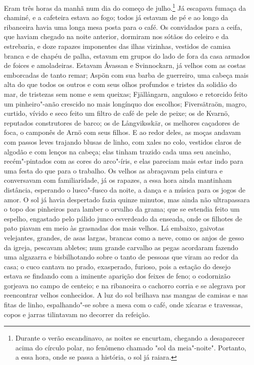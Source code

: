Eram três horas da manhã num dia do começo de julho.\footnote{ Durante o 
verão escandinavo, as noites se encurtam, chegando a desaparecer 
acima do círculo polar, no fenômeno chamado "sol da meia"-noite". Portanto, 
a essa hora, onde se passa a história, o sol já raiara.} Já escapava fumaça da
chaminé, e a cafeteira estava ao fogo; todos já estavam de pé e ao longo da
ribanceira havia uma longa mesa posta para o café. Os convidados para a ceifa,
que haviam chegado na noite anterior, dormiram nos sótãos do celeiro e da
estrebaria, e doze rapazes imponentes das ilhas vizinhas, vestidos de camisa
branca e de chapéu de palha, estavam em grupos do lado de fora da casa armados de
foices e amoladeiras. Estavam Åvassan e Svinnockarn, já velhos com as costas
emborcadas de tanto remar; Aspön com sua barba de guerreiro, uma cabeça mais
alta do que todos os outros e com seus olhos profundos e tristes da solidão do
mar, de tristezas sem nome e sem queixas; Fjällångarn, anguloso e retorcido
feito um pinheiro"-anão crescido no mais longínquo dos
escolhos; Fiversätraön, magro, curtido, vívido e seco feito um filtro de café de
pele de peixe; os de Kvarnö, reputados construtores de barco; os de
Långviksskär, os melhores caçadores de foca, o camponês de Arnö com seus filhos.
E ao redor deles, as moças andavam com passos leves trajando blusas
de linho, com xales no colo, vestidos claros de algodão e com lenços na cabeça;
elas tinham trazido cada uma seu ancinho, recém"-pintados com as cores do
arco"-íris, e elas pareciam mais estar indo para uma festa do que para o
trabalho. Os velhos as abraçavam pela cintura e conversavam com familiaridade,
já os rapazes, a essa hora ainda mantinham distância, esperando o lusco"-fusco da
noite, a dança e a música para os jogos de amor. O sol já havia despertado
fazia quinze minutos, mas ainda não ultrapassara o topo dos pinheiros para
lamber o orvalho da grama; que se estendia feito um espelho, engastado pelo
pálido junco esverdeado da enseada, onde os filhotes de pato piavam em meio às
grasnadas dos mais velhos. Lá embaixo, gaivotas velejantes,
grandes, de asas largas, brancas como a neve, como os anjos de gesso da igreja, pescavam abletes;
num grande carvalho as pegas acordaram fazendo uma algazarra e bisbilhotando
sobre o tanto de pessoas que viram ao redor da casa; o cuco cantava no prado,
exasperado, furioso, pois a estação do desejo estava se findando com a iminente
aparição dos feixes de feno; o codornizão gorjeava no campo de centeio; e na
ribanceira o cachorro corria e se alegrava por reencontrar velhos conhecidos. A
luz do sol brilhava nas mangas de camisas e nas fitas de linho, espalhando"-se
sobre a mesa com o café, onde xícaras e travessas, copos e jarras tilintavam
no decorrer da refeição.

